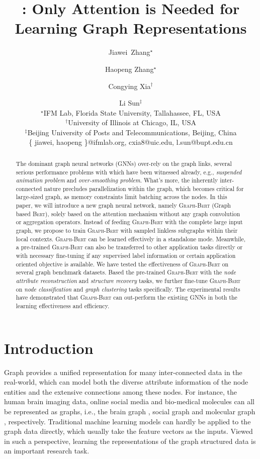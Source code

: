 \documentclass{article}
\title{{\our}: Only Attention is Needed for Learning Graph Representations}
\author{Jiawei~Zhang$^\star$ \and Haopeng Zhang$^\star$ \and Congying Xia$^\dagger$ \and Li Sun$^\ddagger$\\
\affiliations
$^\star$IFM Lab, Florida State University, Tallahassee, FL, USA\\
$^\dagger$University of Illinois at Chicago, IL, USA\\
$^\ddagger$Beijing University of Posts and Telecommunications, Beijing, China\\
 \emails
 \{ jiawei, haopeng \}@ifmlab.org, cxia8@uic.edu, l.sun@bupt.edu.cn}
\newcommand{\our}{\textsc{Graph-Bert}}
\newcommand{\bert}{\textsc{Bert}}
\begin{document}
\maketitle

\begin{abstract}

The dominant graph neural networks (GNNs) over-rely on the graph links, several serious performance problems with which have been witnessed already, e.g., \textit{suspended animation problem} and \textit{over-smoothing problem}. What's more, the inherently inter-connected nature precludes parallelization within the graph, which becomes critical for large-sized graph, as memory constraints limit batching across the nodes. In this paper, we will introduce a new graph neural network, namely {\our} (Graph based {\bert}), solely based on the attention mechanism without any graph convolution or aggregation operators. Instead of feeding {\our} with the complete large input graph, we propose to train {\our} with sampled linkless subgraphs within their local contexts. {\our} can be learned effectively in a standalone mode. Meanwhile, a pre-trained {\our} can also be transferred to other application tasks directly or with necessary fine-tuning if any supervised label information or certain application oriented objective is available. We have tested the effectiveness of {\our} on several graph benchmark datasets. Based the pre-trained {\our} with the \textit{node attribute reconstruction} and \textit{structure recovery} tasks, we further fine-tune {\our} on \textit{node classification} and \textit{graph clustering} tasks specifically. The experimental results have demonstrated that {\our} can out-perform the existing GNNs in both the learning effectiveness and efficiency. 

\end{abstract}
\section{Introduction}\label{sec:introduction}




Graph provides a unified representation for many inter-connected data in the real-world, which can model both the diverse attribute information of the node entities and the extensive connections among these nodes. For instance, the human brain imaging data, online social media and bio-medical molecules can all be represented as graphs, i.e., the brain graph \cite{Meng_Isomorphic_19}, social graph \cite{Ugander_Anatomy_11} and molecular graph \cite{Jin_Junction_18}, respectively. Traditional machine learning models can hardly be applied to the graph data directly, which usually take the feature vectors as the inputs. Viewed in such a perspective, learning the representations of the graph structured data is an important research task.
\end{document}
